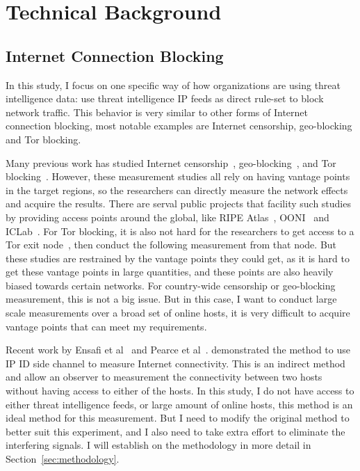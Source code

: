 \section{Technical Background}

\subsection{Internet Connection Blocking}
In this study, I focus on one specific way of how organizations are using 
threat intelligence data: use threat intelligence IP feeds as direct rule-set 
to block network traffic. This behavior is very similar to other forms of
Internet connection blocking, most notable examples are Internet censorship,
geo-blocking and Tor blocking.

Many previous work has studied Internet censorship~\cite{aryan2013internet,
park2010empirical,anderson2012splinternet,zittrain2003internet,
clayton2006ignoring}, geo-blocking~\cite{opennetsurvey, mcdonald2018403,afroz2018exploring}, 
and Tor blocking~\cite{singh2017characterizing, khattak2016you}. However, 
these measurement studies all rely on having vantage points in the target 
regions, so the researchers can directly measure the network effects and 
acquire the results. There are serval public projects that facility such 
studies by providing access points around the global, like RIPE
Atlas~\cite{ripeatlas}, OONI~\cite{ooni} and ICLab~\cite{iclab}.
For Tor blocking, it is also not hard for the researchers to get access 
to a Tor exit node~\cite{khattak2016you}, then conduct the following 
measurement from that node. But these studies are restrained by the vantage
points they could get, as it is hard to get these vantage points in large
quantities, and these points are also heavily biased towards certain networks.
For country-wide censorship or geo-blocking measurement, this is not a big
issue. But in this case, I want to conduct large scale measurements over a 
broad set of online hosts, it is very difficult to acquire vantage points 
that can meet my requirements.

Recent work by Ensafi et al~\cite{ensafi2014detecting} and Pearce et 
al~\cite{pearce2017augur}. demonstrated the method to use IP ID side 
channel to measure Internet connectivity. This is an indirect method 
and allow an observer to measurement the connectivity between two hosts 
without having access to either of the hosts. In this study, I do not 
have access to either threat intelligence feeds, or large amount of 
online hosts, this method is an ideal method for this measurement. But 
I need to modify the original method to better suit this experiment, 
and I also need to take extra effort to eliminate the interfering 
signals. I will establish on the methodology in more detail in
Section~\ref{sec:methodology}.

